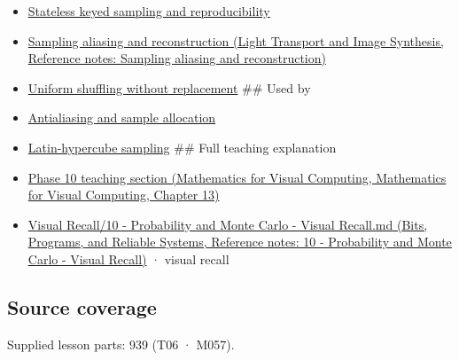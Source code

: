 \begin{itemize}
\item
  \hyperref[appendix-daaf25bfd3a0]{Stateless keyed sampling and reproducibility}
\item
  \href{../04-Light-Transport-and-Image-Synthesis/main.pdf\#nameddest=appendix-6a7869dd79a6}{Sampling aliasing and reconstruction (Light Transport and Image Synthesis, Reference notes: Sampling aliasing and reconstruction)}
\item
  \hyperref[appendix-184fcc411663]{Uniform shuffling without replacement} \#\# Used by
\item
  \hyperref[appendix-4192b2bdd21e]{Antialiasing and sample allocation}
\item
  \hyperref[appendix-1c5e85693a06]{Latin-hypercube sampling} \#\# Full teaching explanation
\item
  \href{../02-Mathematics-for-Visual-Computing/main.pdf\#nameddest=02-foundations-ii-ch029-a-computer-produces-deterministic-pseudorandom-sequences}{Phase 10 teaching section (Mathematics for Visual Computing, Mathematics for Visual Computing, Chapter 13)}
\item
  \href{../01-Bits-Programs-and-Reliable-Systems/main.pdf\#nameddest=appendix-cb5af353ef77}{Visual Recall/10 - Probability and Monte Carlo - Visual Recall.md (Bits, Programs, and Reliable Systems, Reference notes: 10 - Probability and Monte Carlo - Visual Recall)} · visual recall
\end{itemize}

\subsection{Source coverage}\label{appendix-9f693ffd82bc-source-coverage}

Supplied lesson parts: 939 (T06 · M057).
